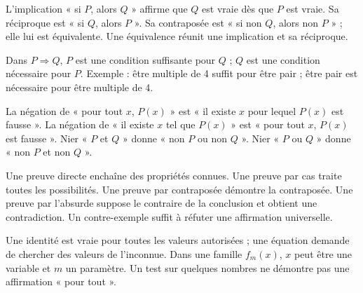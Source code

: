 \clearpage
{}
\begin{definition}
L'implication « si $P$, alors $Q$ » affirme que $Q$ est vraie dès que $P$
est vraie. Sa réciproque est « si $Q$, alors $P$ ».
Sa contraposée est « si non $Q$, alors non $P$ » ; elle lui est équivalente.
Une équivalence réunit une implication et sa réciproque.
\end{definition}
\begin{propriete}
Dans $P\Rightarrow Q$, $P$ est une condition suffisante pour $Q$ ; $Q$ est
une condition nécessaire pour $P$. Exemple : être multiple de 4 suffit
pour être pair ; être pair est nécessaire pour être multiple de 4.
\end{propriete}
\begin{propriete}
La négation de « pour tout $x$, $P(x)$ » est « il existe $x$ pour lequel $P(x)$
est fausse ». La négation de « il existe $x$ tel que $P(x)$ » est
« pour tout $x$, $P(x)$ est fausse ». Nier « $P$ et $Q$ » donne « non $P$ ou non $Q$ ».
Nier « $P$ ou $Q$ » donne « non $P$ et non $Q$ ».
\end{propriete}
\begin{savoirfaire}
Une preuve directe enchaîne des propriétés connues. Une preuve par cas
traite toutes les possibilités. Une preuve par contraposée démontre la
contraposée. Une preuve par l'absurde suppose le contraire de la conclusion
et obtient une contradiction. Un contre-exemple suffit à réfuter une affirmation universelle.
\end{savoirfaire}
\begin{attention}
Une identité est vraie pour toutes les valeurs autorisées ; une équation
demande de chercher des valeurs de l'inconnue. Dans une famille $f_m(x)$,
$x$ peut être une variable et $m$ un paramètre. Un test sur quelques nombres
ne démontre pas une affirmation « pour tout ».
\end{attention}

\exercices

